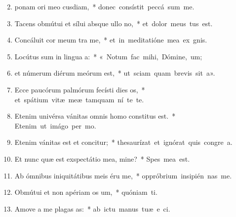 \begin{flushleft}
\begin{enumerate}[leftmargin=*]
\setcounter{enumi}{1}

\item ponam ori meo cusdiam,~* \mbox{donec consístit peccá sum me.}

\item Tacens obmútui et sílui absque ullo no,~* \mbox{et dolor meus tus est.}

\item Concáluit cor meum tra me,~* \mbox{et in meditatióne mea ex gnis.}

\item Locútus sum in lingua a:~* \mbox{« Notum fac mihi, Dómine,  um;}

\item et númerum diérum meórum  est,~* \mbox{ut sciam quam brevis sit  a».}

\item Ecce paucórum palmórum fecísti dies os,~* \mbox{et spátium vitæ meæ tamquam ní te te.}

\item Etenim univérsa vánitas omnis homo constitus est.~* \mbox{Etenim ut imágo per mo.}

\item Etenim vánitas est et concitur;~* \mbox{thesaurízat et ignórat quis congre a.}

\item Et nunc quæ est exspectátio mea, mine?~* \mbox{Spes mea   est.}

\item Ab ómnibus iniquitátibus meis éru me,~* \mbox{oppróbrium insipién  nas me.}

\item Obmútui et non apériam os um,~* \mbox{quóniam  ti.}

\item Amove a me plagas as:~* \mbox{ab ictu manus tuæ e ci.}


\end{enumerate}
\end{flushleft}
